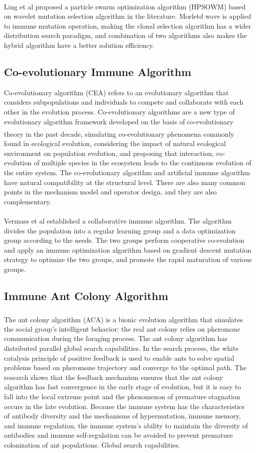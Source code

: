\documentclass[11pt,a4paper,oldfontcommands]{memoir}
\newcommand{\upcite}[1]{\textsuperscript{\textsuperscript{\cite{#1}}}}
\begin{document}
Ling et al\upcite{Ling.2008} proposed a particle swarm optimization algorithm (HPSOWM) based on wavelet mutation selection algorithm in the literature. Morletd wave is applied to immune mutation operation, making the clonal selection algorithm has a wider distribution search paradigm, and combination of two algorithms also makes the hybrid algorithm have a better solution efficiency.

\subsection{Co-evolutionary Immune Algorithm}
Co-evolutionary algorithm (CEA) refers to an evolutionary algorithm that considers subpopulations and individuals to compete and collaborate with each other in the evolution process. Co-evolutionary algorithms are a new type of evolutionary algorithm framework developed on the basis of co-evolutionary theory in the past decade\upcite{Potter.1994}, simulating co-evolutionary phenomena commonly found in ecological evolution, considering the impact of natural ecological environment on population evolution, and proposing that interaction, co-evolution of multiple species in the ecosystem leads to the continuous evolution of the entire system. The co-evolutionary algorithm and artificial immune algorithm have natural compatibility at the structural level. There are also many common points in the mechanism model and operator design, and they are also complementary.

Vermass et al\upcite{Vermaas.2009} established a collaborative immune algorithm. The algorithm divides the population into a regular learning group and a data optimization group according to the needs. The two groups perform cooperative co-evolution and apply an immune optimization algorithm based on gradient descent mutation strategy to optimize the two groups, and promote the rapid maturation of various groups.

\subsection{Immune Ant Colony Algorithm}
The ant colony algorithm (ACA)\upcite{Dorigo.1996} is a bionic evolution algorithm that simulates the social group's intelligent behavior: the real ant colony relies on pheromone communication during the foraging process. The ant colony algorithm has distributed parallel global search capabilities. In the search process, the white catalysis principle of positive feedback is used to enable ants to solve spatial problems based on pheromone trajectory and converge to the optimal path. The research shows that the feedback mechanism ensures that the ant colony algorithm has fast convergence in the early stage of evolution, but it is easy to fall into the local extreme point and the phenomenon of premature stagnation occurs in the late evolution. Because the immune system has the characteristics of antibody diversity and the mechanisms of hypermutation, immune memory, and immune regulation, the immune system's ability to maintain the diversity of antibodies and immune self-regulation can be avoided to prevent premature colonization of ant populations. Global search capabilities.
\end{document}
